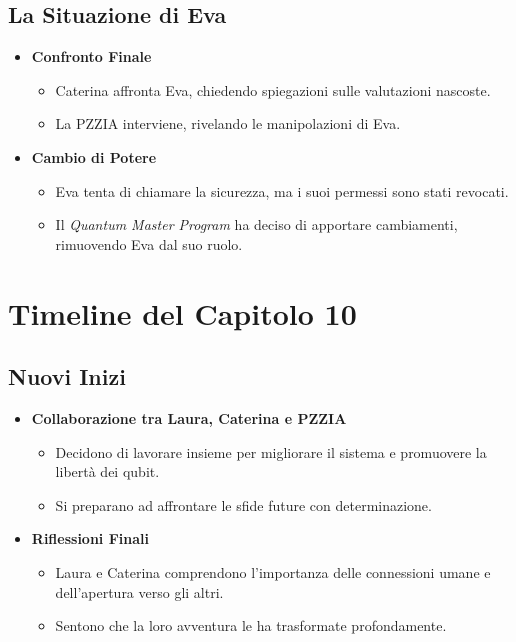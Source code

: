 \subsection*{La Situazione di Eva}

\begin{itemize}
    \item \textbf{Confronto Finale}
    \begin{itemize}
        \item Caterina affronta Eva, chiedendo spiegazioni sulle valutazioni nascoste.
        \item La PZZIA interviene, rivelando le manipolazioni di Eva.
    \end{itemize}

    \item \textbf{Cambio di Potere}
    \begin{itemize}
        \item Eva tenta di chiamare la sicurezza, ma i suoi permessi sono stati revocati.
        \item Il \emph{Quantum Master Program} ha deciso di apportare cambiamenti, rimuovendo Eva dal suo ruolo.
    \end{itemize}
\end{itemize}

\section*{Timeline del Capitolo 10}

\subsection*{Nuovi Inizi}

\begin{itemize}
    \item \textbf{Collaborazione tra Laura, Caterina e PZZIA}
    \begin{itemize}
        \item Decidono di lavorare insieme per migliorare il sistema e promuovere la libertà dei qubit.
        \item Si preparano ad affrontare le sfide future con determinazione.
    \end{itemize}

    \item \textbf{Riflessioni Finali}
    \begin{itemize}
        \item Laura e Caterina comprendono l'importanza delle connessioni umane e dell'apertura verso gli altri.
        \item Sentono che la loro avventura le ha trasformate profondamente.
    \end{itemize}
\end{itemize}

